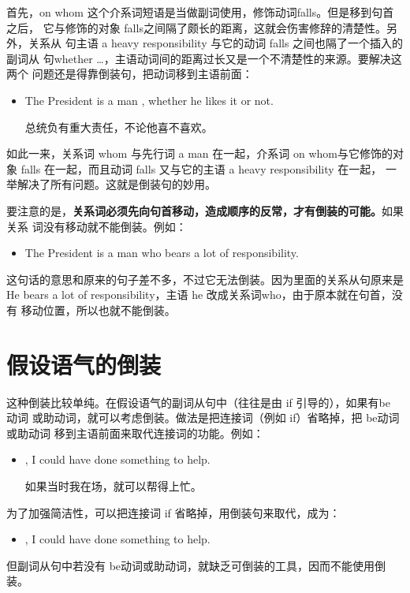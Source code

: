 首先，on whom 这个介系词短语是当做副词使用，修饰动词falls。但是移到句首之后，
它与修饰的对象 falls之间隔了颇长的距离，这就会伤害修辞的清楚性。另外，关系从
句主语 a heavy responsibility 与它的动词 falls 之间也隔了一个插入的副词从
句whether \ldots{}，主语动词间的距离过长又是一个不清楚性的来源。要解决这两个
问题还是得靠倒装句，把动词移到主语前面：
\begin{itemize}
\item The President is a man ,
  whether he likes it or not.

  总统负有重大责任，不论他喜不喜欢。
\end{itemize}
如此一来，关系词 whom 与先行词 a man 在一起，介系词 on whom与它修饰的对
象 falls 在一起，而且动词 falls 又与它的主语 a heavy responsibility 在一起，
一举解决了所有问题。这就是倒装句的妙用。

要注意的是，\textbf{关系词必须先向句首移动，造成顺序的反常，才有倒装的可能。}如果关系
词没有移动就不能倒装。例如：
\begin{itemize}
\item The President is a man who bears a lot of responsibility.
\end{itemize}
这句话的意思和原来的句子差不多，不过它无法倒装。因为里面的关系从句原来是He
bears a lot of responsibility，主语 he 改成关系词who，由于原本就在句首，没有
移动位置，所以也就不能倒装。

\section{假设语气的倒装}

这种倒装比较单纯。在假设语气的副词从句中（往往是由 if 引导的），如果有be 动词
或助动词，就可以考虑倒装。做法是把连接词（例如 if）省略掉，把 be动词或助动词
移到主语前面来取代连接词的功能。例如：
\begin{itemize}
\item {}, I could have done something to help.

  如果当时我在场，就可以帮得上忙。
\end{itemize}
为了加强简洁性，可以把连接词 if 省略掉，用倒装句来取代，成为：
\begin{itemize}
\item {}, I could have done something to help.
\end{itemize}

但副词从句中若没有 be动词或助动词，就缺乏可倒装的工具，因而不能使用倒装。

